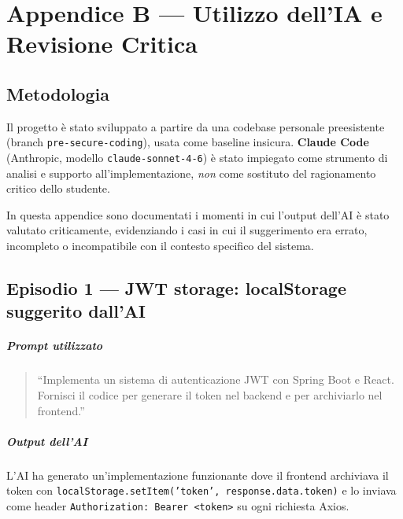 ﻿\documentclass[a4paper,12pt]{report}
\begin{document}
\chapter{Appendice B --- Utilizzo dell'IA e Revisione Critica}
\label{app:ia}

\section{Metodologia}

Il progetto è stato sviluppato a partire da una codebase personale preesistente
(branch \texttt{pre-secure-coding}), usata come baseline insicura.
\textbf{Claude Code} (Anthropic, modello \texttt{claude-sonnet-4-6}) è stato impiegato
come strumento di analisi e supporto all'implementazione, \emph{non} come sostituto
del ragionamento critico dello studente.

In questa appendice sono documentati i momenti in cui l'output dell'AI è stato valutato
criticamente, evidenziando i casi in cui il suggerimento era errato, incompleto o
incompatibile con il contesto specifico del sistema.

\section{Episodio 1 --- JWT storage: localStorage suggerito dall'AI}

\paragraph{Prompt utilizzato}
\begin{quote}
``Implementa un sistema di autenticazione JWT con Spring Boot e React.
Fornisci il codice per generare il token nel backend e per archiviarlo nel frontend.''
\end{quote}

\paragraph{Output dell'AI}
L'AI ha generato un'implementazione funzionante dove il frontend archiviava
il token con \texttt{localStorage.setItem('token', response.data.token)}
e lo inviava come header \texttt{Authorization: Bearer <token>} su ogni richiesta Axios.
\end{document}
